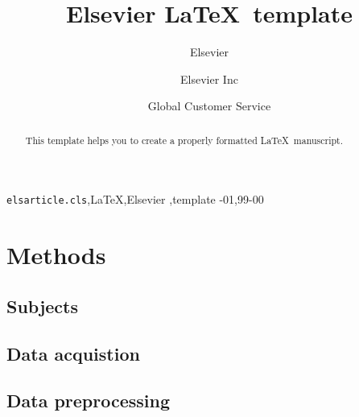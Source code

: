 \documentclass[review]{elsarticle}
\begin{document}
\begin{frontmatter}

\title{Elsevier \LaTeX\ template}

\author{Elsevier}
\address{Radarweg 29, Amsterdam}

\author[mymainaddress,mysecondaryaddress]{Elsevier Inc}

\author[mysecondaryaddress]{Global Customer Service}

\address[mymainaddress]{1600 John F Kennedy Boulevard, Philadelphia}
\address[mysecondaryaddress]{360 Park Avenue South, New York}

\begin{abstract}
This template helps you to create a properly formatted \LaTeX\ manuscript.
\end{abstract}

\begin{keyword}
\texttt{elsarticle.cls}\sep \LaTeX\sep Elsevier \sep template
-01\sep  99-00
\end{keyword}

\end{frontmatter}

\linenumbers

\section{Methods}
\subsection{Subjects}
\subsection{Data acquistion}
\subsection{Data preprocessing}
\end{document}
